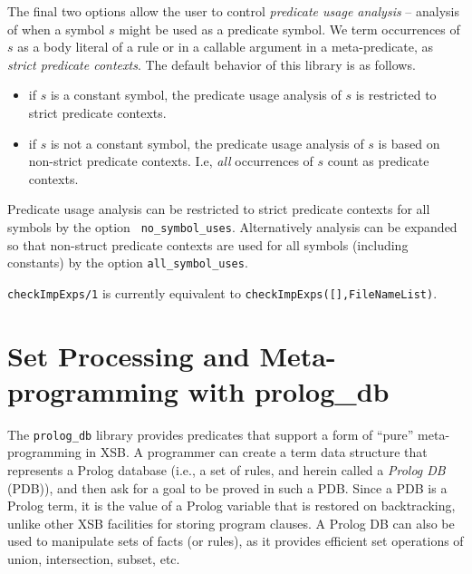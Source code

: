 \begin{description}
The final two options allow the user to control {\em predicate usage
  analysis} -- analysis of when a symbol $s$ might be used as a
predicate symbol.  We term occurrences of $s$ as a body literal of a
rule or in a callable argument in a meta-predicate, as {\em strict
  predicate contexts}.  The default behavior of this library is as
follows.
\begin{itemize}
\item if $s$ is a constant symbol, the predicate usage analysis of $s$
  is restricted to strict predicate contexts.
\item if $s$ is not a constant symbol, the predicate usage analysis of
  $s$ is based on non-strict predicate contexts.  I.e, {\em all}
  occurrences of $s$ count as predicate contexts.
\end{itemize}
Predicate usage analysis can be restricted to strict predicate
contexts for all symbols by the option {\tt
  no\_symbol\_uses}. Alternatively analysis can be expanded so that
non-struct predicate contexts are used for all symbols (including
constants) by the option {\tt all\_symbol\_uses}.


%
{\tt checkImpExps/1}  is
currently equivalent to {\tt checkImpExps([],FileNameList)}.
\end{description}

\section{Set Processing and Meta-programming with prolog\_db}

The {\tt prolog\_db} library provides predicates that support a form
of ``pure'' meta-programming in XSB.  A programmer can create a term
data structure that represents a Prolog database (i.e., a set of
rules, and herein called a {\em Prolog DB} (PDB)), and then ask for a
goal to be proved in such a PDB.  Since a PDB is a Prolog term, it is
the value of a Prolog variable that is restored on backtracking,
unlike other XSB facilities for storing program clauses.  A Prolog DB
can also be used to manipulate sets of facts (or rules), as it
provides efficient set operations of union, intersection, subset, etc.


